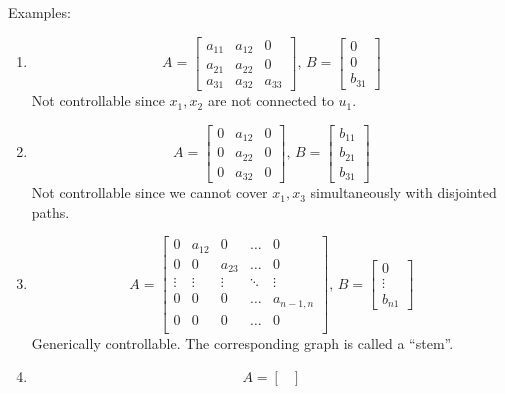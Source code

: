 \documentclass{article}
\begin{document}
Examples:
\begin{enumerate}
  \item \begin{displaymath}
  A = \begin{bmatrix}
    a_{11}&a_{12}&0\\
    a_{21}&a_{22}&0\\
    a_{31}&a_{32}&a_{33}
  \end{bmatrix},\,B = \begin{bmatrix}
    0\\
    0\\
    b_{31}
  \end{bmatrix}
\end{displaymath}
Not controllable since $x_1,x_2$ are not connected to $u_1$.
\item \begin{displaymath}
  A = \begin{bmatrix}
    0&a_{12}&0\\
    0&a_{22}&0\\
    0&a_{32}&0
  \end{bmatrix},\,B = \begin{bmatrix}
    b_{11}\\
    b_{21}\\
    b_{31}
  \end{bmatrix}
\end{displaymath}
Not controllable since we cannot cover $x_1,x_3$ simultaneously with disjointed paths.
\item \begin{displaymath}
  A = \begin{bmatrix}
    0&a_{12}&0&\dots& 0\\
    0&0&a_{23}&\dots&0\\
    \vdots&\vdots&\vdots&\ddots&\vdots\\
    0&0&0&\dots&a_{n-1,n}\\
    0&0&0&\dots&0\\
  \end{bmatrix},\,B = \begin{bmatrix}
    0\\
    \vdots\\
    b_{n1}
  \end{bmatrix}
\end{displaymath}
Generically controllable. The corresponding graph is called a ``stem''.
\item \begin{displaymath}
  A = \begin{bmatrix}

\end{bmatrix}
\end{displaymath}
\end{enumerate}
\end{document}

